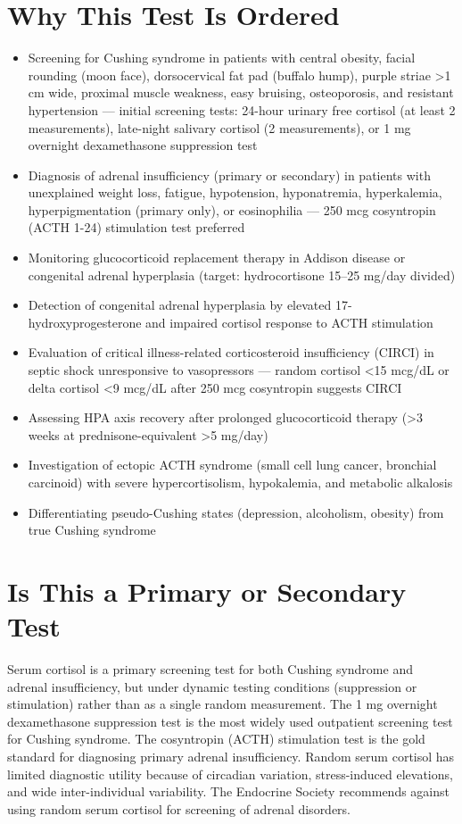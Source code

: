 \section*{Why This Test Is Ordered}
\begin{itemize}
  \item Screening for Cushing syndrome in patients with central obesity, facial rounding (moon face), dorsocervical fat pad (buffalo hump), purple striae >1 cm wide, proximal muscle weakness, easy bruising, osteoporosis, and resistant hypertension --- initial screening tests: 24-hour urinary free cortisol (at least 2 measurements), late-night salivary cortisol (2 measurements), or 1 mg overnight dexamethasone suppression test
  \item Diagnosis of adrenal insufficiency (primary or secondary) in patients with unexplained weight loss, fatigue, hypotension, hyponatremia, hyperkalemia, hyperpigmentation (primary only), or eosinophilia --- 250 mcg cosyntropin (ACTH 1-24) stimulation test preferred
  \item Monitoring glucocorticoid replacement therapy in Addison disease or congenital adrenal hyperplasia (target: hydrocortisone 15--25 mg/day divided)
  \item Detection of congenital adrenal hyperplasia by elevated 17-hydroxyprogesterone and impaired cortisol response to ACTH stimulation
  \item Evaluation of critical illness-related corticosteroid insufficiency (CIRCI) in septic shock unresponsive to vasopressors --- random cortisol <15 mcg/dL or delta cortisol <9 mcg/dL after 250 mcg cosyntropin suggests CIRCI
  \item Assessing HPA axis recovery after prolonged glucocorticoid therapy (>3 weeks at prednisone-equivalent >5 mg/day)
  \item Investigation of ectopic ACTH syndrome (small cell lung cancer, bronchial carcinoid) with severe hypercortisolism, hypokalemia, and metabolic alkalosis
  \item Differentiating pseudo-Cushing states (depression, alcoholism, obesity) from true Cushing syndrome
\end{itemize}

\section*{Is This a Primary or Secondary Test}
Serum cortisol is a primary screening test for both Cushing syndrome and adrenal insufficiency, but under dynamic testing conditions (suppression or stimulation) rather than as a single random measurement. The 1 mg overnight dexamethasone suppression test is the most widely used outpatient screening test for Cushing syndrome. The cosyntropin (ACTH) stimulation test is the gold standard for diagnosing primary adrenal insufficiency. Random serum cortisol has limited diagnostic utility because of circadian variation, stress-induced elevations, and wide inter-individual variability. The Endocrine Society recommends against using random serum cortisol for screening of adrenal disorders.


